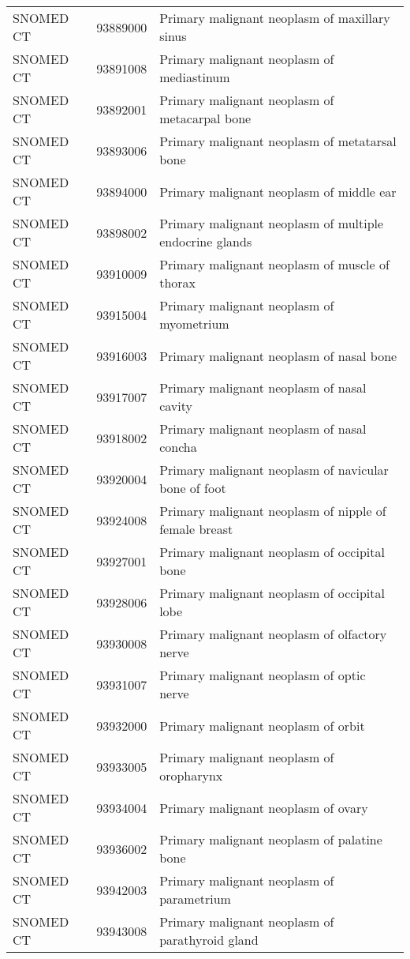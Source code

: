 \begin{longtable}{p{}p{}p{}}
  SNOMED CT & 93889000 & Primary malignant neoplasm of maxillary sinus \\ 
  SNOMED CT & 93891008 & Primary malignant neoplasm of mediastinum \\ 
  SNOMED CT & 93892001 & Primary malignant neoplasm of metacarpal bone \\ 
  SNOMED CT & 93893006 & Primary malignant neoplasm of metatarsal bone \\ 
  SNOMED CT & 93894000 & Primary malignant neoplasm of middle ear \\ 
  SNOMED CT & 93898002 & Primary malignant neoplasm of multiple endocrine glands \\ 
  SNOMED CT & 93910009 & Primary malignant neoplasm of muscle of thorax \\ 
  SNOMED CT & 93915004 & Primary malignant neoplasm of myometrium \\ 
  SNOMED CT & 93916003 & Primary malignant neoplasm of nasal bone \\ 
  SNOMED CT & 93917007 & Primary malignant neoplasm of nasal cavity \\ 
  SNOMED CT & 93918002 & Primary malignant neoplasm of nasal concha \\ 
  SNOMED CT & 93920004 & Primary malignant neoplasm of navicular bone of foot \\ 
  SNOMED CT & 93924008 & Primary malignant neoplasm of nipple of female breast \\ 
  SNOMED CT & 93927001 & Primary malignant neoplasm of occipital bone \\ 
  SNOMED CT & 93928006 & Primary malignant neoplasm of occipital lobe \\ 
  SNOMED CT & 93930008 & Primary malignant neoplasm of olfactory nerve \\ 
  SNOMED CT & 93931007 & Primary malignant neoplasm of optic nerve \\ 
  SNOMED CT & 93932000 & Primary malignant neoplasm of orbit \\ 
  SNOMED CT & 93933005 & Primary malignant neoplasm of oropharynx \\ 
  SNOMED CT & 93934004 & Primary malignant neoplasm of ovary \\ 
  SNOMED CT & 93936002 & Primary malignant neoplasm of palatine bone \\ 
  SNOMED CT & 93942003 & Primary malignant neoplasm of parametrium \\ 
  SNOMED CT & 93943008 & Primary malignant neoplasm of parathyroid gland \\ 

\end{longtable}

